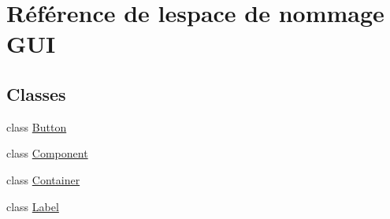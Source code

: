 \hypertarget{namespace_g_u_i}{}\section{Référence de l\textquotesingle{}espace de nommage G\+UI}
\label{namespace_g_u_i}
\subsection*{Classes}
\begin{DoxyCompactItemize}
\item 
class \hyperlink{class_g_u_i_1_1_button}{Button}
\item 
class \hyperlink{class_g_u_i_1_1_component}{Component}
\item 
class \hyperlink{class_g_u_i_1_1_container}{Container}
\item 
class \hyperlink{class_g_u_i_1_1_label}{Label}
\end{DoxyCompactItemize}

